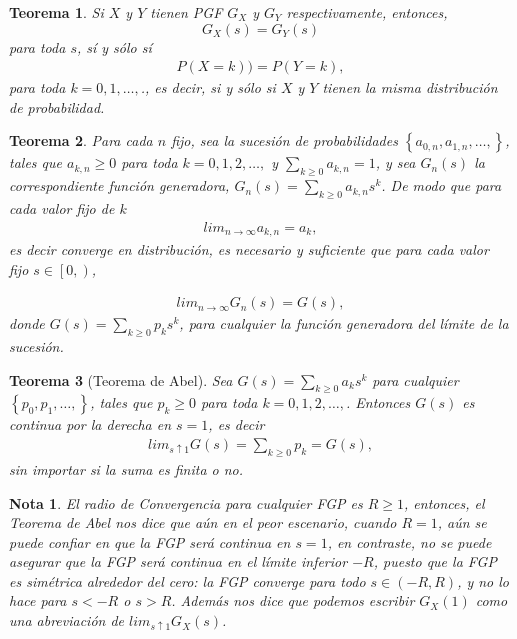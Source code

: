 \documentclass{article}
\newtheorem{Teo}{Teorema}[section]
\newtheorem{Note}{Nota}[section]
\numberwithin{equation}{section}
\begin{document}
\begin{Teo}
Si $X$ y $Y$ tienen PGF $G_{X}$ y $G_{Y}$ respectivamente, entonces,\[G_{X}\left(s\right)=G_{Y}\left(s\right)\] para toda $s$, s\'i y s\'olo s\'i
\begin{eqnarray}
P\left(X=k\right))=P\left(Y=k\right),
\end{eqnarray}
para toda $k=0,1,\ldots,$., es decir, si y s\'olo si $X$ y $Y$ tienen la misma distribuci\'on de probabilidad.
\end{Teo}

\begin{Teo}
Para cada $n$ fijo, sea la sucesi\'on de probabilidades $\left\{a_{0,n},a_{1,n},\ldots,\right\}$, tales que $a_{k,n}\geq0$ para toda $k=0,1,2,\ldots,$ y $\sum_{k\geq0}a_{k,n}=1$, y sea $G_{n}\left(s\right)$ la correspondiente funci\'on generadora, $G_{n}\left(s\right)=\sum_{k\geq0}a_{k,n}s^{k}$. De modo que para cada valor fijo de $k$
\begin{eqnarray}
lim_{n\rightarrow\infty}a_{k,n}=a_{k},
\end{eqnarray}
es decir converge en distribuci\'on, es necesario y suficiente que para cada valor fijo $s\in\left[0,\right)$,

\begin{eqnarray}
lim_{n\rightarrow\infty}G_{n}\left(s\right)=G\left(s\right),
\end{eqnarray}
donde $G\left(s\right)=\sum_{k\geq0}p_{k}s^{k}$, para cualquier la funci\'on generadora del l\'imite de la sucesi\'on.
\end{Teo}

\begin{Teo}[Teorema de Abel]
Sea $G\left(s\right)=\sum_{k\geq0}a_{k}s^{k}$ para cualquier $\left\{p_{0},p_{1},\ldots,\right\}$, tales que $p_{k}\geq0$ para toda $k=0,1,2,\ldots,$. Entonces $G\left(s\right)$ es continua por la derecha en $s=1$, es decir
\begin{eqnarray}
lim_{s\uparrow1}G\left(s\right)=\sum_{k\geq0}p_{k}=G\left(s\right),
\end{eqnarray}
sin importar si la suma es finita o no.
\end{Teo}

\begin{Note}
El radio de Convergencia para cualquier FGP es $R\geq1$, entonces, el Teorema de Abel nos dice que a\'un en el peor escenario, cuando $R=1$, a\'un se puede confiar en que la FGP ser\'a continua en $s=1$, en contraste, no se puede asegurar que la FGP ser\'a continua en el l\'imite inferior $-R$, puesto que la FGP es sim\'etrica alrededor del cero: la FGP converge para todo $s\in\left(-R,R\right)$, y no lo hace para $s<-R$ o $s>R$. Adem\'as nos dice que podemos escribir $G_{X}\left(1\right)$ como una abreviaci\'on de $lim_{s\uparrow1}G_{X}\left(s\right)$.
\end{Note}
\end{document}

